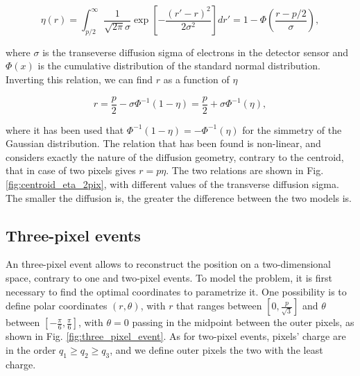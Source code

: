 \begin{equation}
\eta(r) = \int ^{\infty}_{p/2} \frac{1}{\sqrt{2\pi}\sigma} \exp \left[ - \frac{(r' - r)^2}{2\sigma^2}  \right] dr' = 1 - \Phi \left( \frac{r - p/2}{\sigma} \right),
\end{equation}

where $\sigma$ is the transeverse diffusion sigma of electrons in the detector sensor and $\Phi(x)$ is the cumulative distribution of the standard normal distribution. Inverting this relation, we can find $r$ as a function of $\eta$

\begin{equation}
r = \frac{p}{2} - \sigma \Phi^{-1}(1 - \eta) = \frac{p}{2} + \sigma \Phi^{-1}(\eta),
\label{eq:eta_2pix}
\end{equation}

where it has been used that $\Phi^{-1}(1 - \eta) = -\Phi^{-1}(\eta)$ for the simmetry of the Gaussian distribution. The relation that has been found is non-linear, and considers exactly the nature of the diffusion geometry, contrary to the centroid, that in case of two pixels gives $r = p \eta$. The two relations are shown in Fig. \ref{fig:centroid_eta_2pix}, with different values of the transverse diffusion sigma. The smaller the diffusion is, the greater the difference between the two models is.

\subsection{Three-pixel events}

An three-pixel event allows to reconstruct the position on a two-dimensional space, contrary to one and two-pixel events. To model the problem, it is first necessary to find the optimal coordinates to parametrize it. One possibility is to define polar coordinates $(r, \theta)$, with $r$ that ranges between $[0, \frac{p}{\sqrt{3}}]$ and $\theta$ between $[-\frac{\pi}{6}, \frac{\pi}{6}]$, with $\theta = 0$ passing in the midpoint between the outer pixels, as shown in Fig. \ref{fig:three_pixel_event}. As for two-pixel events, pixels' charge are in the order $q_1 \geq q_2 \geq q_3$, and we define outer pixels the two with the least charge. 

